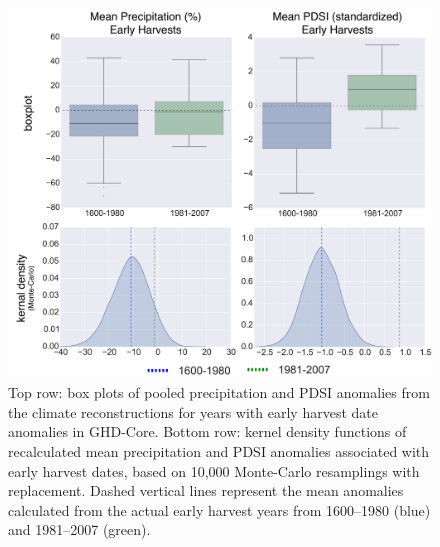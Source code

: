 \documentclass[12pt]{article}
\begin{document}
\begin{figure}
\center
\includegraphics[width=1.0\columnwidth,scale=2]{SUPP_fig_15_JJA_boxplot_monte.png}
\caption{Top row: box plots of pooled precipitation and PDSI anomalies from the climate reconstructions for years with early harvest date anomalies in GHD-Core. Bottom row: kernel density functions of recalculated mean precipitation and PDSI anomalies associated with early harvest dates, based on 10,000 Monte-Carlo resamplings with replacement. Dashed vertical lines represent the mean anomalies calculated from the actual early harvest years from 1600--1980 (blue) and 1981--2007 (green).}
\end{figure}
\end{document}
